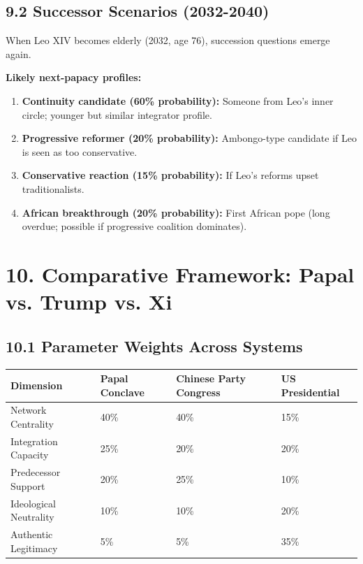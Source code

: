 \documentclass[11pt]{article}
\begin{document}
\subsection{9.2 Successor Scenarios (2032-2040)}

When Leo XIV becomes elderly (2032, age 76), succession questions emerge again.

\textbf{Likely next-papacy profiles:}

\begin{enumerate}
\item \textbf{Continuity candidate (60\% probability):} Someone from Leo's inner circle; younger but similar integrator profile.

\item \textbf{Progressive reformer (20\% probability):} Ambongo-type candidate if Leo is seen as too conservative.

\item \textbf{Conservative reaction (15\% probability):} If Leo's reforms upset traditionalists.

\item \textbf{African breakthrough (20\% probability):} First African pope (long overdue; possible if progressive coalition dominates).
\end{enumerate}

\section{10. Comparative Framework: Papal vs. Trump vs. Xi}

\subsection{10.1 Parameter Weights Across Systems}

\begin{table}[h]
\centering
\begin{tabular}{|l|l|l|l|}
\hline
\textbf{Dimension} & \textbf{Papal Conclave} & \textbf{Chinese Party Congress} & \textbf{US Presidential} \\
\hline
Network Centrality & 40\% & 40\% & 15\% \\
Integration Capacity & 25\% & 20\% & 20\% \\
Predecessor Support & 20\% & 25\% & 10\% \\
Ideological Neutrality & 10\% & 10\% & 20\% \\
Authentic Legitimacy & 5\% & 5\% & 35\% \\
\hline
\end{tabular}
\end{table}
\end{document}
